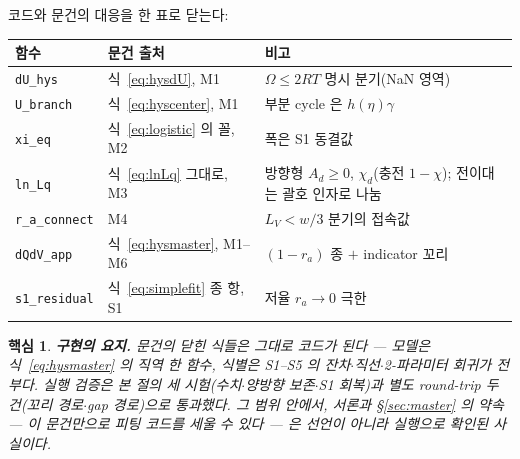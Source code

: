 \documentclass[11pt,a4paper]{article}
\newtheorem*{keybox}{핵심}
\begin{document}
코드와 문건의 대응을 한 표로 닫는다:
\begin{center}
\renewcommand{\arraystretch}{1.3}
\begin{tabular}{p{} p{} p{}}
\toprule
함수 & 문건 출처 & 비고 \\
\midrule
\texttt{dU\_hys} & 식~\eqref{eq:hysdU}, M1 & $\Omega\le2RT$ 명시 분기(NaN 영역) \\
\texttt{U\_branch} & 식~\eqref{eq:hyscenter}, M1 & 부분 cycle 은 $h(\eta)\gamma$ \\
\texttt{xi\_eq} & 식~\eqref{eq:logistic} 의 꼴, M2 & 폭은 S1 동결값 \\
\texttt{ln\_Lq} & 식~\eqref{eq:lnLq} 그대로, M3 & 방향형 $A_d\ge0$, $\chi_d$(충전 $1-\chi$); 전이대는 괄호 인자로 나눔 \\
\texttt{r\_a\_connect} & M4 & $L_V<w/3$ 분기의 접속값 \\
\texttt{dQdV\_app} & 식~\eqref{eq:hysmaster}, M1--M6 & $(1-r_a)$ 종 $+$ indicator 꼬리 \\
\texttt{s1\_residual} & 식~\eqref{eq:simplefit} 종 항, S1 & 저율 $r_a\to0$ 극한 \\
\bottomrule
\end{tabular}
\end{center}

\begin{keybox}
\textbf{구현의 요지.} 문건의 닫힌 식들은 그대로 코드가 된다 — 모델은 식~\eqref{eq:hysmaster} 의 직역
한 함수, 식별은 S1--S5 의 잔차$\cdot$직선$\cdot$2-파라미터 회귀가 전부다. 실행 검증은 본 절의 세
시험(수치$\cdot$양방향 보존$\cdot$S1 회복)과 별도 round-trip 두 건(꼬리 경로$\cdot$gap 경로)으로
통과했다. 그 범위 안에서, 서론과 \S\ref{sec:master} 의 약속 — 이 문건만으로 피팅 코드를 세울 수 있다 — 은 선언이 아니라
실행으로 확인된 사실이다.
\end{keybox}
\end{document}
